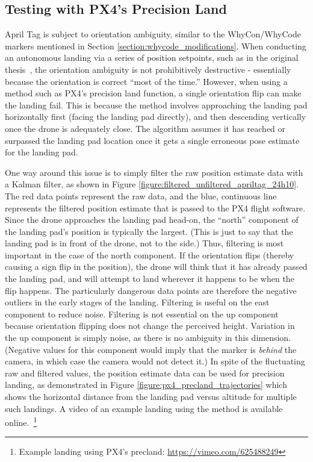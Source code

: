 \subsection{Testing with PX4's Precision Land}

April Tag is subject to orientation ambiguity, similar to the WhyCon/WhyCode markers mentioned in Section \ref{section:whycode_modifications}.
When conducting an autonomous landing via a series of position setpoints, such as in the original thesis~\cite{joshua_master_thesis},
the orientation ambiguity is not prohibitively destructive - essentially because the orientation is correct ``most of the time.''
However, when using a method such as PX4's precision land function, a single orientation flip can make the landing fail.
This is because the method involves approaching the landing pad horizontally first (facing the landing pad directly),
and then descending vertically once the drone is adequately close.
The algorithm assumes it has reached or surpassed the landing pad location once it gets a single erroneous pose estimate for the landing pad.

One way around this issue is to simply filter the raw position estimate data with a Kalman filter, as shown in Figure \ref{figure:filtered_unfiltered_apriltag_24h10}.
The red data points represent the raw data, and the blue, continuous line represents the filtered position estimate
that is passed to the PX4 flight software.
Since the drone approaches the landing pad head-on, the ``north'' component of the landing pad's position is typically
the largest.
(This is just to say that the landing pad is in front of the drone, not to the side.)
Thus, filtering is most important in the case of the north component.
If the orientation flips (thereby causing a sign flip in the position),
the drone will think that it has already passed the landing pad, and will attempt to land wherever it happens to be
when the flip happens.
The particularly dangerous data points are therefore the negative outliers in the early stages of the landing.
Filtering is useful on the east component to reduce noise.
Filtering is not essential on the up component because orientation flipping does not change the perceived height.
Variation in the up component is simply noise, as there is no ambiguity in this dimension.
(Negative values for this component would imply that the marker is \textit{behind} the camera, in which case the camera would not detect it.)
In spite of the fluctuating raw and filtered values, the position estimate data can be used for precision landing,
as demonstrated in Figure \ref{figure:px4_precland_trajectories} which shows the horizontal distance from the landing pad versus altitude for multiple such landings.
A video of an example landing using the method is available online.~\footnote{Example landing using PX4's precland: \url{https://vimeo.com/625488249}}

